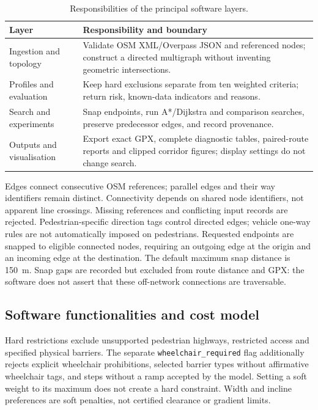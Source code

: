 \documentclass[preprint,12pt,a4paper]{elsarticle}
\begin{document}
\begin{table}[!ht]
\small
\begin{tabularx}{\textwidth}{@{}p{}Y@{}}
\toprule
\textbf{Layer} & \textbf{Responsibility and boundary} \\
\midrule
Ingestion and topology & Validate OSM XML/Overpass JSON and referenced nodes; construct a directed multigraph without inventing geometric intersections. \\
Profiles and evaluation & Keep hard exclusions separate from ten weighted criteria; return risk, known-data indicators and reasons. \\
Search and experiments & Snap endpoints, run A*/Dijkstra and comparison searches, preserve predecessor edges, and record provenance. \\
Outputs and visualisation & Export exact GPX, complete diagnostic tables, paired-route reports and clipped corridor figures; display settings do not change search. \\
\bottomrule
\end{tabularx}
\caption{Responsibilities of the principal software layers.}
\label{tab:architecture}
\end{table}

Edges connect consecutive OSM references; parallel edges and their way identifiers
remain distinct. Connectivity depends on shared node identifiers, not apparent
line crossings. Missing references and conflicting input records are rejected.
Pedestrian-specific direction tags control directed edges; vehicle one-way rules
are not automatically imposed on pedestrians. Requested endpoints are snapped
to eligible connected nodes, requiring an outgoing edge at the origin and an
incoming edge at the destination. The default maximum snap distance is 150~m.
Snap gaps are recorded but excluded from route distance and GPX: the software
does not assert that these off-network connections are traversable.

\subsection{Software functionalities and cost model}
\label{sec:model}
Hard restrictions exclude unsupported pedestrian highways, restricted access
and specified physical barriers. The separate \texttt{wheelchair\_required}
flag additionally rejects explicit wheelchair prohibitions, selected barrier
types without affirmative wheelchair tags, and steps without a ramp accepted
by the model. Setting a soft weight to its maximum does not create a hard
constraint. Width and incline preferences are soft penalties, not certified
clearance or gradient limits.
\end{document}
